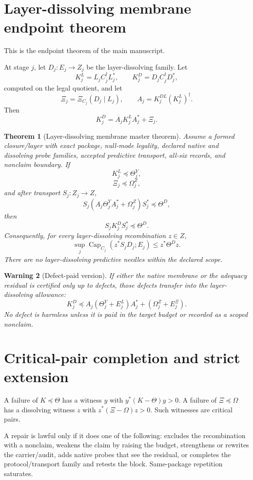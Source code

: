 \documentclass[11pt]{article}
\newtheorem{theorem}{Theorem}[section]
\newtheorem{warning}[theorem]{Warning}
\DeclareMathOperator{\Capacity}{Cap}
\newcommand{\XiRes}{\Xi}
\newcommand{\preceqq}{\preceq}
\begin{document}
\section{Layer-dissolving membrane endpoint theorem}
This is the endpoint theorem of the main manuscript.

At stage \(j\), let \(D_j:E_j\to Z_j\) be the layer-dissolving family.  Let
\[
  K^L_j=L_jC_j^\dagger L_j^*,\qquad K^D_j=D_jC_j^\dagger D_j^*,
\]
computed on the legal quotient, and let
\[
  \Xi_j=\XiRes_{C_j}(D_j\mid L_j),\qquad A_j=K^{DL}_j(K^L_j)^\dagger.
\]
Then
\[
  K^D_j=A_jK^L_jA_j^*+\Xi_j.
\]

\begin{theorem}[Layer-dissolving membrane master theorem]
Assume a formed closure/layer with exact package, null-mode legality, declared native and dissolving probe families, accepted predictive transport, all-six records, and nonclaim boundary.  If
\[
  K^L_j\preceqq\Theta^Y_j,
\]
\[
  \Xi_j\preceqq\Omega^Z_j,
\]
and after transport \(S_j:Z_j\to Z\),
\[
  S_j(A_j\Theta^Y_jA_j^*+\Omega^Z_j)S_j^*\preceqq\Theta^D,
\]
then
\[
  S_jK^D_jS_j^*\preceqq\Theta^D.
\]
Consequently, for every layer-dissolving recombination \(z\in Z\),
\[
  \sup_j \Capacity_{C_j}(z^*S_jD_j;E_j)\le z^*\Theta^Dz.
\]
There are no layer-dissolving predictive needles within the declared scope.
\end{theorem}

\begin{warning}[Defect-paid version]
If either the native membrane or the adequacy residual is certified only up to defects, those defects transfer into the layer-dissolving allowance:
\[
  K^D_j\preceqq A_j(\Theta^Y_j+E^L_j)A_j^*+(\Omega^Z_j+E^\Xi_j).
\]
No defect is harmless unless it is paid in the target budget or recorded as a scoped nonclaim.
\end{warning}

\section{Critical-pair completion and strict extension}
A failure of \(K\preceqq\Theta\) has a witness \(y\) with \(y^*(K-\Theta)y>0\).  A failure of \(\Xi\preceqq\Omega\) has a dissolving witness \(z\) with \(z^*(\Xi-\Omega)z>0\).  Such witnesses are critical pairs.

A repair is lawful only if it does one of the following: excludes the recombination with a nonclaim, weakens the claim by raising the budget, strengthens or rewrites the carrier/audit, adds native probes that see the residual, or completes the protocol/transport family and retests the block.  Same-package repetition saturates.
\end{document}
